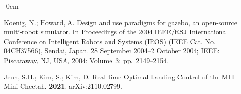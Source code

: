 \documentclass[sensors,article,accept,pdftex,moreauthors]{Definitions/mdpi}
\begin{document}
\begin{adjustwidth}{-\extralength}{0cm}
\begin{thebibliography}{999}
Koenig, N.; Howard, A.
\newblock Design and use paradigms for gazebo, an open-source multi-robot
  simulator.
\newblock In Proceedings of the 2004 IEEE/RSJ International Conference on
  Intelligent Robots and Systems (IROS) (IEEE Cat. No. 04CH37566), Sendai, Japan, 28 September 2004--2 October 2004; IEEE: Piscataway, NJ, USA,  2004;
  Volume~3; pp.~2149--2154.

Jeon, S.H.; Kim, S.; Kim, D.
\newblock Real-time Optimal Landing Control of the MIT Mini Cheetah.
 {\bf 2021},  arXiv:2110.02799.

\end{thebibliography}




\end{adjustwidth}
\end{document}
